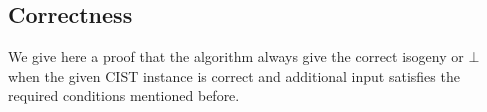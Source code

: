 \documentclass[12pt,a4paper]{article}
\begin{document}
\begin{algorithm}
					\While{$res\neq\top$ and $b<2^{r'}$}{
						\textbf{Let} $\varphi_1:E_0\to E_1$ be the isogeny that verifies $\forall
						i\in[1,r'],
						(\ker\varphi_1)[l_i^{e'_i}] =\langle L_{i,b[i]}\rangle$\;\label{line:makeguess}
						

						\If{$E_1 = E_2$}{
							$\varphi\gets\varphi_2\circ\varphi_1$\;
						 $\alpha,\beta\gets \log_{\varphi(P)}(S),\log_{\varphi(Q)}(T)$\;
							$res\gets\top$\;
						}
						\Else{
							$b\gets b+1$ in binary operation	
						}	
					}
					\Else{
						\Return $\bot$
					}
				\end{algorithm}




				\subsection{Correctness}
				We give here a proof that the algorithm always give the correct isogeny or $\bot$ when the
				given CIST instance is correct and additional input satisfies the required conditions
				mentioned before.
\end{document}
